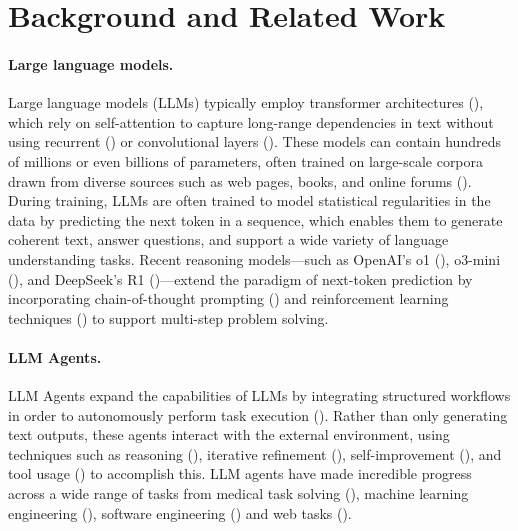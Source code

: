 \documentclass[11pt, a4paper]{include/gdm_format}
\begin{document}
\section{Background and Related Work}


\paragraph{Large language models.} Large language models (LLMs) typically employ transformer architectures (\cite{vaswani2017attention}), which rely on self-attention to capture long-range dependencies in text without using recurrent (\cite{rumelhart1985learning, jordan1997serial}) or convolutional layers (\cite{fukushima1980neocognitron, lecun1998gradient}). These models can contain hundreds of millions or even billions of parameters, often trained on large-scale corpora drawn from diverse sources such as web pages, books, and online forums (\cite{radford2018improving, brown2020language, radford2019language, devlin2019bert}). During training, LLMs are often trained to model statistical regularities in the data by predicting the next token in a sequence, which enables them to generate coherent text, answer questions, and support a wide variety of language understanding tasks. Recent reasoning models—such as OpenAI’s o1 (\cite{jaech2024openai}), o3-mini (\cite{o3mini2025}), and DeepSeek’s R1 (\cite{guo2025deepseek})—extend the paradigm of next-token prediction by incorporating chain-of-thought prompting (\cite{wei2022chain}) and reinforcement learning techniques (\cite{shao2024deepseekmath}) to support multi-step problem solving. 


\paragraph{LLM Agents.} LLM Agents expand the capabilities of LLMs by integrating structured workflows in order to autonomously perform task execution (\cite{zhang2024aflow, wu2023autogen, yao2023react, yang2024swe, lu2023chameleon, zhuge2024gptswarm}). Rather than only generating text outputs, these agents interact with the external environment, using techniques such as reasoning (\cite{kojima2022large, yao2023tree, hao2023reasoning, wei2022chain}), iterative refinement (\cite{madaan2023self}), self-improvement (\cite{shinn2023reflexion, huang2022large}), and tool usage (\cite{paranjape2023art, qin2023toolllm, hao2024toolkengpt, m2024augmenting, schick2023toolformer, qu2024toolsurvey}) to accomplish this. LLM agents have made incredible progress across a wide range of tasks from medical task solving (\cite{schmidgall2024agentclinic, li2024agent, tu2024towards, shi2024ehragent}), machine learning engineering (\cite{chan2024mle, guo2024ds, huang2024mlagentbench, nathani2025mlgym}), software engineering  (\cite{jimenez2023swe, yang2024swe, wang2024opendevin}) and web tasks (\cite{gur2023real, putta2024agent, deng2024mind2web, shi2017world, he2024webvoyager}).
\end{document}

